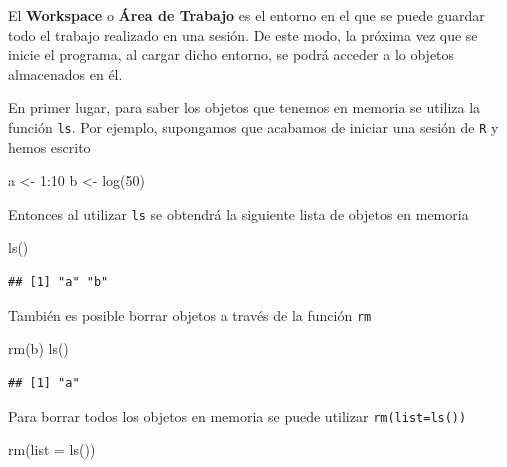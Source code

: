 \documentclass[
]{book}
\newenvironment{Shaded}{\begin{snugshade}}{\end{snugshade}}
\newcommand{\AttributeTok}[1]{\textcolor[rgb]{0.77,0.63,0.00}{#1}}
\newcommand{\DecValTok}[1]{\textcolor[rgb]{0.00,0.00,0.81}{#1}}
\newcommand{\FunctionTok}[1]{\textcolor[rgb]{0.00,0.00,0.00}{#1}}
\newcommand{\NormalTok}[1]{#1}
\newcommand{\OtherTok}[1]{\textcolor[rgb]{0.56,0.35,0.01}{#1}}
\newcommand{\SpecialCharTok}[1]{\textcolor[rgb]{0.00,0.00,0.00}{#1}}
\theoremstyle{break}
\begin{document}
El \textbf{Workspace} o \textbf{Área de Trabajo} es el entorno en el que se puede
guardar todo el trabajo realizado en una sesión. De este modo, la
próxima vez que se inicie el programa, al cargar dicho entorno, se podrá
acceder a lo objetos almacenados en él.

En primer lugar, para saber los objetos que tenemos en memoria se
utiliza la función \texttt{ls}. Por ejemplo, supongamos que acabamos de iniciar
una sesión de \texttt{R} y hemos escrito

\begin{Shaded}
\begin{Highlighting}[]
\NormalTok{a }\OtherTok{\textless{}{-}} \DecValTok{1}\SpecialCharTok{:}\DecValTok{10}
\NormalTok{b }\OtherTok{\textless{}{-}} \FunctionTok{log}\NormalTok{(}\DecValTok{50}\NormalTok{)}
\end{Highlighting}
\end{Shaded}

Entonces al utilizar \texttt{ls} se obtendrá la siguiente lista de objetos en
memoria

\begin{Shaded}
\begin{Highlighting}[]
\FunctionTok{ls}\NormalTok{()}
\end{Highlighting}
\end{Shaded}

\begin{verbatim}
## [1] "a" "b"
\end{verbatim}

También es posible borrar objetos a través de la función
\texttt{rm}

\begin{Shaded}
\begin{Highlighting}[]
\FunctionTok{rm}\NormalTok{(b)}
\FunctionTok{ls}\NormalTok{()}
\end{Highlighting}
\end{Shaded}

\begin{verbatim}
## [1] "a"
\end{verbatim}

Para borrar todos los objetos en memoria se puede utilizar
\texttt{rm(list=ls())}

\begin{Shaded}
\begin{Highlighting}[]
\FunctionTok{rm}\NormalTok{(}\AttributeTok{list =} \FunctionTok{ls}\NormalTok{())}
\end{Highlighting}
\end{Shaded}
\end{document}

